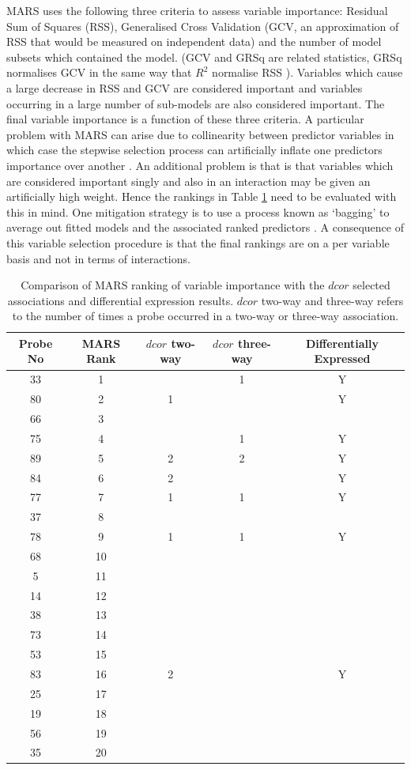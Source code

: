 \documentclass[a4paper, 12pt]{report}
\begin{document}
MARS uses the following three criteria to assess variable importance: Residual Sum of Squares (RSS), Generalised Cross Validation (GCV, an approximation of RSS that would be measured on independent data) and the number of model subsets which contained the model. (GCV and GRSq are related statistics, GRSq normalises GCV in the same way that $R^2$ normalise RSS \cite{earth}). Variables which cause a large decrease in RSS and GCV are considered important and variables occurring in a large number of sub-models are also considered important. The final variable importance is a function of these three criteria. A particular problem with MARS can arise due to collinearity between predictor variables in which case the stepwise selection process can artificially inflate one predictors importance over another \cite{earth}. An additional problem is that is that variables which are considered important singly and also in an interaction may be given an artificially high weight. Hence the rankings in Table \ref{T:MARS} need to be evaluated with this in mind. One mitigation strategy is to use a process known as `bagging' to average out fitted models and the associated ranked predictors \cite{earth}. A consequence of this variable selection procedure is that the final rankings are on a per variable basis and not in terms of interactions. 

\begin{table}[H]
\begin{tabular}{ccccc}
  \hline
Probe No & MARS Rank & $dcor$ two-way & $dcor$ three-way & Differentially Expressed \\ 
  \hline
33 & 1  &  & 1 & Y \\ 
80 & 2  & 1 &  & Y \\ 
66 & 3  &  &  &  \\ 
75 & 4  &  & 1 & Y \\ 
89 & 5 & 2 & 2 & Y \\ 
84 & 6  & 2 &  & Y \\ 
 77 & 7  & 1 & 1 & Y \\ 
37 & 8  &  &  &  \\ 
 78 & 9  & 1 & 1 & Y \\ 
 68 & 10  &  &  &  \\ 
  5 & 11  &  &  &  \\ 
  14 & 12  &  &  &  \\ 
  38 & 13 &  &  &  \\ 
  73 & 14  &  &  &  \\ 
  53 & 15  &  &  &  \\ 
  83 & 16  & 2 &  & Y \\ 
  25 & 17 &  &  &  \\ 
  19 & 18  &  &  &  \\ 
  56 & 19 &  &  &  \\ 
  35 & 20  &  &  &  \\ 
   \hline
\end{tabular}
\caption{Comparison of MARS ranking of variable importance with the $dcor$ selected associations and differential expression results. $dcor$ two-way and three-way refers to the number of times a probe occurred in a two-way or three-way association.} 
\label{T:MARS}
\end{table}
\end{document}
